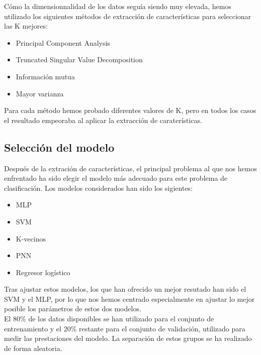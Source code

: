 \documentclass[journal,twoside]{JoPhA}
\begin{document}
Cómo la dimensionnalidad de los datos seguía siendo muy elevada, hemos utilizado los siguientes métodos de extracción de características para seleccionar las K mejores: \\

\begin{itemize}
	\item Principal Component Analysis
	\item Truncated Singular Value Decomposition
	\item Información mutua
	\item Mayor varianza
\end{itemize}

Para cada método hemos probado diferentes valores de K, pero en todos los casos el resultado empeoraba al aplicar la extracción de caraterísticas. \\

\subsection{Selección del modelo}
Después de la extración de características, el principal problema al que nos hemos enfrentado ha sido elegir el modelo más adecuado para este problema de clasificación. Los modelos considerados han sido los sigientes: \\

\begin{itemize}
	\item MLP
	\item SVM
	\item K-vecinos
	\item PNN
	\item Regresor logístico
\end{itemize} 

Tras ajustar estos modelos, los que han ofrecido un mejor resutado han sido el SVM y el MLP, por lo que nos hemos centrado especialmente en ajustar lo mejor posible los parámetros de estos dos modelos. \\

El 80\% de los datos disponibles se han utilizado para el conjunto de entrenamiento y el 20\% restante para el conjunto de validación, utilizado para medir las prestaciones del modelo. La separación de estos grupos se ha realizado de forma aleatoria. \\
\end{document}
